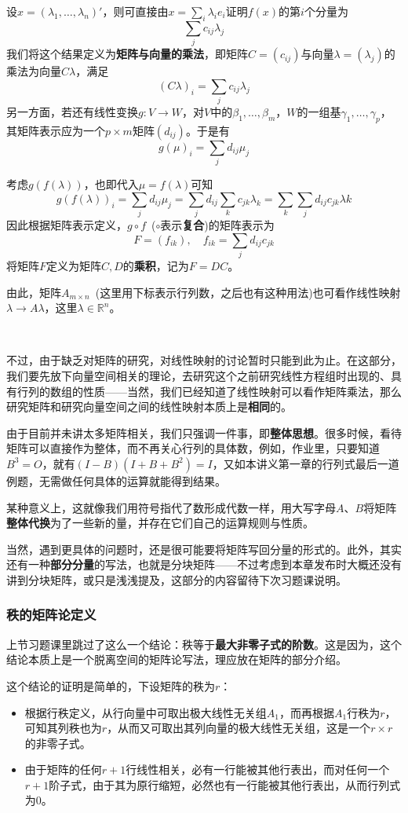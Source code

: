 \documentclass[a4paper,UTF8,fontset=windows]{ctexart}
\newcommand*{\note}{\noindent *}
\begin{document}
设$x=(\lambda_1,\dots,\lambda_n)'$，则可直接由$x=\sum_i\lambda_ie_i$证明$f(x)$的第$i$个分量为
$$\sum_jc_{ij}\lambda_j$$
我们将这个结果定义为\textbf{矩阵与向量的乘法}，即矩阵$C=(c_{ij})$与向量$\lambda=(\lambda_j)$的乘法为向量$C\lambda$，满足
$$(C\lambda)_i=\sum_jc_{ij}\lambda_j$$
另一方面，若还有线性变换$g:V\to W$，对$V$中的$\beta_1,\dots,\beta_m$，$W$的一组基$\gamma_1,\dots,\gamma_p$，其矩阵表示应为一个$p\times m$矩阵$(d_{ij})$。于是有
$$g(\mu)_i=\sum_jd_{ij}\mu_j$$

考虑$g(f(\lambda))$，也即代入$\mu=f(\lambda)$可知
$$g(f(\lambda))_i=\sum_jd_{ij}\mu_j=\sum_jd_{ij}\sum_kc_{jk}\lambda_k=\sum_k\sum_jd_{ij}c_{jk}\lambda k$$
因此根据矩阵表示定义，$g\circ f$\ ($\circ$表示\textbf{复合})的矩阵表示为
$$F=(f_{ik}),\quad f_{ik}=\sum_jd_{ij}c_{jk}$$
将矩阵$F$定义为矩阵$C,D$的\textbf{乘积}，记为$F=DC$。

\note 由此，矩阵$A_{m\times n}$\ (这里用下标表示行列数，之后也有这种用法)也可看作线性映射$\lambda\to A\lambda$，这里$\lambda\in\mathbb{R}^n$。

\

不过，由于缺乏对矩阵的研究，对线性映射的讨论暂时只能到此为止。在这部分，我们要先放下向量空间相关的理论，去研究这个之前研究线性方程组时出现的、具有行列的数组的性质——当然，我们已经知道了线性映射可以看作矩阵乘法，那么研究矩阵和研究向量空间之间的线性映射本质上是\textbf{相同}的。

由于目前并未讲太多矩阵相关，我们只强调一件事，即\textbf{整体思想}。很多时候，看待矩阵可以直接作为整体，而不再关心行列的具体数，例如，作业里，只要知道$B^3=O$，就有$(I-B)(I+B+B^2)=I$，又如本讲义第一章的行列式最后一道例题，无需做任何具体的运算就能得到结果。

某种意义上，这就像我们用符号指代了数形成代数一样，用大写字母$A$、$B$将矩阵\textbf{整体代换}为了一些新的量，并存在它们自己的运算规则与性质。

当然，遇到更具体的问题时，还是很可能要将矩阵写回分量的形式的。此外，其实还有一种\textbf{部分分量}的写法，也就是分块矩阵——不过考虑到本章发布时大概还没有讲到分块矩阵，或只是浅浅提及，这部分的内容留待下次习题课说明。

\subsubsection{秩的矩阵论定义}
上节习题课里跳过了这么一个结论：秩等于\textbf{最大非零子式的阶数}。这是因为，这个结论本质上是一个脱离空间的矩阵论写法，理应放在矩阵的部分介绍。

这个结论的证明是简单的，下设矩阵的秩为$r$：
\begin{itemize}
    \item 根据行秩定义，从行向量中可取出极大线性无关组$A_1$，而再根据$A_1$行秩为$r$，可知其列秩也为$r$，从而又可取出其列向量的极大线性无关组，这是一个$r\times r$的非零子式。
    \item 由于矩阵的任何$r+1$行线性相关，必有一行能被其他行表出，而对任何一个$r+1$阶子式，由于其为原行缩短，必然也有一行能被其他行表出，从而行列式为0。
\end{itemize}
\end{document}
